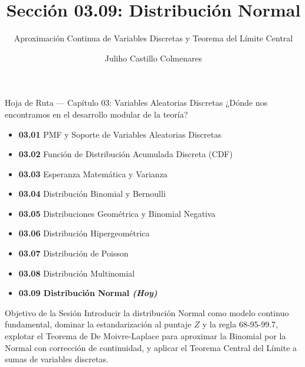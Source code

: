 \documentclass[10pt, aspectratio=169]{beamer}
\title[Distribución Normal]{Sección 03.09: Distribución Normal}
\subtitle{Aproximación Continua de Variables Discretas y Teorema del Límite Central}
\author[J. Castillo Colmenares]{Juliho Castillo Colmenares}
\institute{Tecnológico de Monterrey}
\date{\vspace{-1.2cm}}
\begin{document}
\begin{frame}[plain]
  \titlepage
\end{frame}

\begin{frame}{Hoja de Ruta --- Capítulo 03: Variables Aleatorias Discretas}
  \footnotesize
  ¿Dónde nos encontramos en el desarrollo modular de la teoría? \pause
  \begin{itemize}\itemsep=0.08em
    \item \textbf{03.01} PMF y Soporte de Variables Aleatorias Discretas \pause
    \item \textbf{03.02} Función de Distribución Acumulada Discreta (CDF) \pause
    \item \textbf{03.03} Esperanza Matemática y Varianza \pause
    \item \textbf{03.04} Distribución Binomial y Bernoulli \pause
    \item \textbf{03.05} Distribuciones Geométrica y Binomial Negativa \pause
    \item \textbf{03.06} Distribución Hipergeométrica \pause
    \item \textbf{03.07} Distribución de Poisson \pause
    \item \textbf{03.08} Distribución Multinomial \pause
    \item \color{TecRojo}\textbf{03.09 Distribución Normal \emph{(Hoy)}}\color{black}
  \end{itemize}
  \vspace{-0.1cm}
  \begin{block}{Objetivo de la Sesión}
    Introducir la distribución Normal como modelo continuo fundamental, dominar la estandarización al puntaje $Z$ y la regla 68-95-99.7, explotar el Teorema de De Moivre-Laplace para aproximar la Binomial por la Normal con corrección de continuidad, y aplicar el Teorema Central del Límite a sumas de variables discretas.
  \end{block}
\end{frame}
\end{document}
